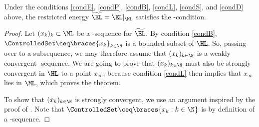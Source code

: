 \begin{theorem}[\PaSma-condition for $\widetilde{\EL}=\EL|_\ML$]
\label{thm:PS-abstract}
Under the conditions \ref{condE}, \ref{condP}, \ref{condB}, \ref{condL}, \ref{condS}, and \ref{condD} above, 
the restricted
energy $\widetilde{\EL}=\EL|_\ML$ satisfies the \PaSma-condition.
\end{theorem}

\begin{proof}
	Let $(x_k)_k\subset\ML$ be a \PaSma-sequence for $\widetilde{\EL}$.
	By condition \ref{condB}, $\ControlledSet \ceq \braces{x_k}_{k \in \N}$ is a bounded subset of $ \HL $. So,
	passing over to a subsequence, we may therefore assume that $(x_{k})_{k \in \N}$ is a weakly convergent \PaSma-sequence. 
	We are going to prove that $(x_{k})_{k \in \N}$ must also be strongly convergent in $\HL$ to a point $x_\infty$;
	because condition \ref{condL} then implies that $x_\infty$ lies in $\ML$, which proves the theorem.

	To show that $(x_{k})_{k \in \N}$ is strongly convergent, we use an argument inspired by the proof of \cite[Lemma 2.1]{cerami-etal_1984}.
	Note that $\ControlledSet \ceq \braces{x_k : k \in \N}$ is \Econtrolled{\EL} by definition of a \PaSma-sequence. 


\end{proof}
